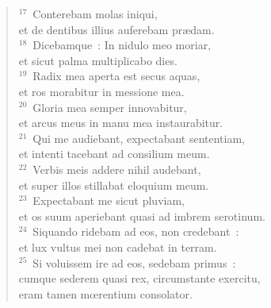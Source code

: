 \begin{flushleft}
\begin{verse}
${}^{17}$~Conterebam molas iniqui,\\ et de dentibus illius auferebam pr\ae dam.\\
${}^{18}$~Dicebamque~: In nidulo meo moriar,\\ et sicut palma multiplicabo dies.\\
${}^{19}$~Radix mea aperta est secus aquas,\\ et ros morabitur in messione mea.\\
${}^{20}$~Gloria mea semper innovabitur,\\ et arcus meus in manu mea instaurabitur.\\
${}^{21}$~Qui me audiebant, expectabant sententiam,\\ et intenti tacebant ad consilium meum.\\
${}^{22}$~Verbis meis addere nihil audebant,\\ et super illos stillabat eloquium meum.\\
${}^{23}$~Expectabant me sicut pluviam,\\ et os suum aperiebant quasi ad imbrem serotinum.\\
${}^{24}$~Siquando ridebam ad eos, non credebant~:\\ et lux vultus mei non cadebat in terram.\\
${}^{25}$~Si voluissem ire ad eos, sedebam primus~:\\ cumque sederem quasi rex, circumstante exercitu,\\ eram tamen mœrentium consolator.\end{verse}\end{flushleft}


